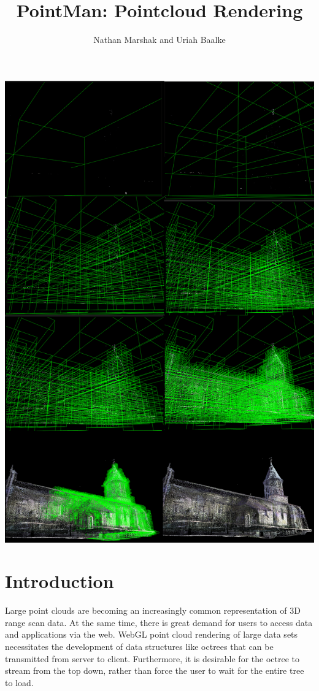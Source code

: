 \documentclass[11pt, twocolumn]{article}
\begin{document}
\newcommand{\sgn}{\mathop{\mathrm{sgn}}}
\title{PointMan: Pointcloud Rendering}
\author{Nathan Marshak and Uriah Baalke}
\maketitle
\includegraphics[scale=0.1]{church_construction.png} 
\section{Introduction}
Large point clouds are becoming an increasingly common representation of 3D range scan data. At the same time, there is great demand for users to access data and applications via the web. WebGL point cloud 
rendering of large data sets necessitates the development of data structures like octrees that can be transmitted from server to client. Furthermore, it is desirable for the octree to stream from the top down, rather
than force the user to wait for the entire tree to load.
\end{document}
